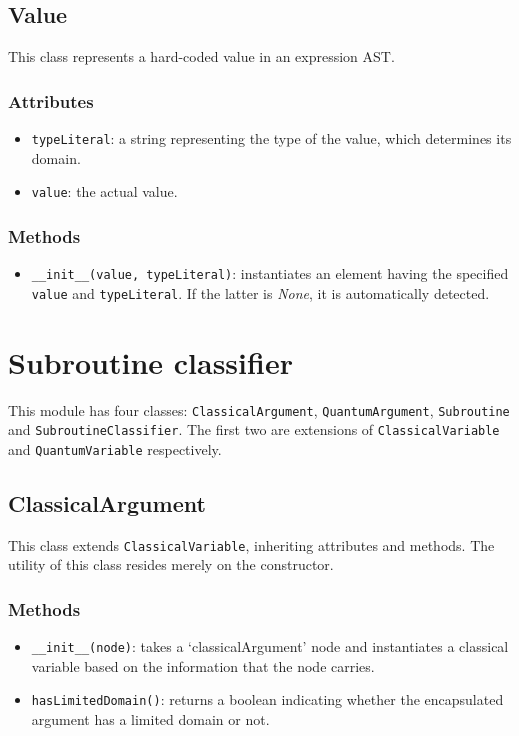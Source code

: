 \documentclass[12pt,a4paper]{report}
\theoremstyle{definition}
\theoremstyle{definition}
\theoremstyle{definition}
\begin{document}
\subsection{Value}
This class represents a hard-coded value in an expression AST.
\subsubsection{Attributes}
\begin{itemize}
    \itemsep 0em
    \item \texttt{typeLiteral}: a string representing the type of the value, which determines its domain.
    \item \texttt{value}: the actual value.
\end{itemize}
\subsubsection{Methods}
\begin{itemize}
    \itemsep 0em
    \item \texttt{\_\_init\_\_(value, typeLiteral)}: instantiates an element having the specified \texttt{value} and \texttt{typeLiteral}. If the latter is \textit{None}, it is automatically detected.
\end{itemize}



\section{Subroutine classifier}
This module has four classes: \texttt{ClassicalArgument}, \texttt{QuantumArgument}, \texttt{Subroutine} and \texttt{SubroutineClassifier}. The first two are extensions of \texttt{ClassicalVariable} and \texttt{QuantumVariable} respectively.
\subsection{ClassicalArgument}
This class extends \texttt{ClassicalVariable}, inheriting attributes and methods.
The utility of this class resides merely on the constructor.
\subsubsection{Methods}
\begin{itemize}
    \itemsep 0em
    \item \texttt{\_\_init\_\_(node)}: takes a `classicalArgument' node and instantiates a classical variable based on the information that the node carries.
    \item \texttt{hasLimitedDomain()}: returns a boolean indicating whether the encapsulated argument has a limited domain or not.
\end{itemize}
\end{document}
